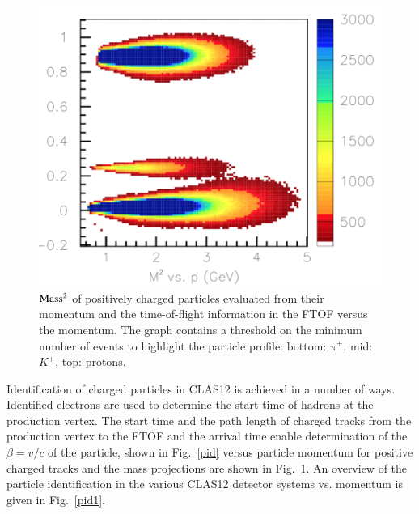 \documentclass[final,3p,twocolumn]{elsarticle}
\begin{document}
\begin{figure}[t!]
\centerline{\includegraphics[width=1.1\columnwidth]{FTOF1b_M2-vs-p.png}}
\caption{{$\rm Mass^2$} of positively charged particles evaluated from their momentum and the time-of-flight information
in the FTOF versus the momentum. The graph contains a threshold on the minimum number of events to highlight the 
particle profile: bottom: $\pi^+$, mid: $K^+$, top: protons.}
\label{pid-1D}
\end{figure} 

Identification of charged particles in CLAS12 is achieved in a number of ways. Identified electrons are used to
determine the start time of hadrons at the production vertex. The start time and the path length of charged tracks
from the production vertex to the FTOF and the arrival time enable determination of the $\beta = v/c$ of the
particle, shown in Fig.~\ref{pid} versus particle momentum for positive charged tracks and the mass projections are
shown in Fig.~\ref{pid-1D}.  An overview of the particle identification in the various CLAS12 detector systems vs.
momentum is given in Fig.~\ref{pid1}. 
\end{document}
